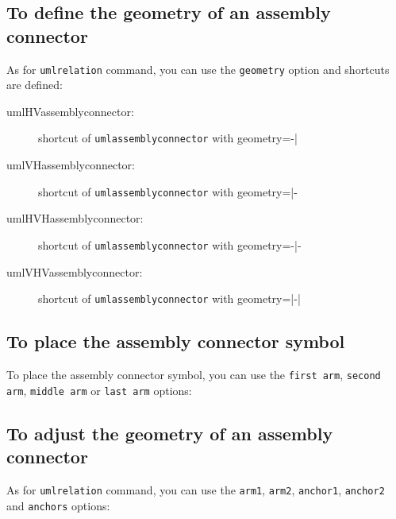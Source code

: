 \documentclass[a4paper,11pt]{report}
\begin{document}
\subsection{To define the geometry of an assembly connector}

As for {\tt umlrelation} command, you can use the {\tt geometry} option and shortcuts are defined:

\begin{description}
	\item[umlHVassemblyconnector:] shortcut of {\tt umlassemblyconnector} with geometry=-|
	\item[umlVHassemblyconnector:] shortcut of {\tt umlassemblyconnector} with geometry=|-
	\item[umlHVHassemblyconnector:] shortcut of {\tt umlassemblyconnector} with geometry=-|-
	\item[umlVHVassemblyconnector:] shortcut of {\tt umlassemblyconnector} with geometry=|-|
\end{description}

\subsection{To place the assembly connector symbol}

To place the assembly connector symbol, you can use the {\tt first arm}, {\tt second arm}, {\tt middle arm} or {\tt last arm} options:

\medskip

\begin{minipage}{0.45\textwidth}
	
\end{minipage}
\begin{minipage}{0.55\textwidth}
	\begin{center}
	\end{center}
\end{minipage}

\subsection{To adjust the geometry of an assembly connector}

As for {\tt umlrelation} command, you can use the {\tt arm1}, {\tt arm2}, {\tt anchor1}, {\tt anchor2} and {\tt anchors} options:

\medskip

\begin{minipage}{0.45\textwidth}
	
\end{minipage}
\begin{minipage}{0.55\textwidth}
	\begin{center}
	\end{center}
\end{minipage}
\end{document}
